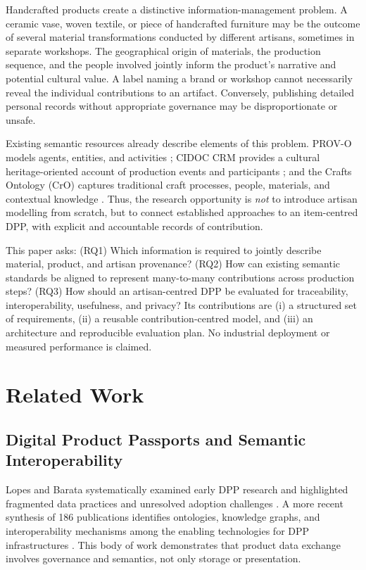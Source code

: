 \documentclass[conference]{IEEEtran}
\begin{document}
Handcrafted products create a distinctive information-management problem. A ceramic vase, woven textile, or piece of handcrafted furniture may be the outcome of several material transformations conducted by different artisans, sometimes in separate workshops. The geographical origin of materials, the production sequence, and the people involved jointly inform the product's narrative and potential cultural value. A label naming a brand or workshop cannot necessarily reveal the individual contributions to an artifact. Conversely, publishing detailed personal records without appropriate governance may be disproportionate or unsafe.

Existing semantic resources already describe elements of this problem. PROV-O models agents, entities, and activities \cite{w3c2013prov}; CIDOC CRM provides a cultural heritage-oriented account of production events and participants \cite{cidoc2024crm}; and the Crafts Ontology (CrO) captures traditional craft processes, people, materials, and contextual knowledge \cite{zabulis2022representation}. Thus, the research opportunity is \emph{not} to introduce artisan modelling from scratch, but to connect established approaches to an item-centred DPP, with explicit and accountable records of contribution.

This paper asks: (RQ1) Which information is required to jointly describe material, product, and artisan provenance? (RQ2) How can existing semantic standards be aligned to represent many-to-many contributions across production steps? (RQ3) How should an artisan-centred DPP be evaluated for traceability, interoperability, usefulness, and privacy? Its contributions are (i) a structured set of requirements, (ii) a reusable contribution-centred model, and (iii) an architecture and reproducible evaluation plan. No industrial deployment or measured performance is claimed.

\section{Related Work}
\subsection{Digital Product Passports and Semantic Interoperability}
Lopes and Barata systematically examined early DPP research and highlighted fragmented data practices and unresolved adoption challenges \cite{lopes2024review}. A more recent synthesis of 186 publications identifies ontologies, knowledge graphs, and interoperability mechanisms among the enabling technologies for DPP infrastructures \cite{zhang2026review}. This body of work demonstrates that product data exchange involves governance and semantics, not only storage or presentation.
\end{document}
